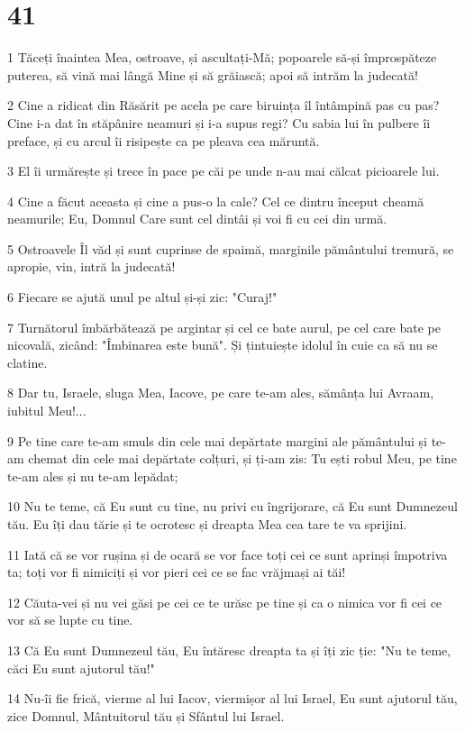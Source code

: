 \chapter{41}

\par 1 Tăceți înaintea Mea, ostroave, și ascultați-Mă; popoarele să-și împrospăteze puterea, să vină mai lângă Mine și să grăiască; apoi să intrăm la judecată!
\par 2 Cine a ridicat din Răsărit pe acela pe care biruința îl întâmpină pas cu pas? Cine i-a dat în stăpânire neamuri și i-a supus regi? Cu sabia lui în pulbere îi preface, și cu arcul îi risipește ca pe pleava cea măruntă.
\par 3 El îi urmărește și trece în pace pe căi pe unde n-au mai călcat picioarele lui.
\par 4 Cine a făcut aceasta și cine a pus-o la cale? Cel ce dintru început cheamă neamurile; Eu, Domnul Care sunt cel dintâi și voi fi cu cei din urmă.
\par 5 Ostroavele Îl văd și sunt cuprinse de spaimă, marginile pământului tremură, se apropie, vin, intră la judecată!
\par 6 Fiecare se ajută unul pe altul și-și zic: "Curaj!"
\par 7 Turnătorul îmbărbătează pe argintar și cel ce bate aurul, pe cel care bate pe nicovală, zicând: "Îmbinarea este bună". Și țintuiește idolul în cuie ca să nu se clatine.
\par 8 Dar tu, Israele, sluga Mea, Iacove, pe care te-am ales, sămânța lui Avraam, iubitul Meu!...
\par 9 Pe tine care te-am smuls din cele mai depărtate margini ale pământului și te-am chemat din cele mai depărtate colțuri, și ți-am zis: Tu ești robul Meu, pe tine te-am ales și nu te-am lepădat;
\par 10 Nu te teme, că Eu sunt cu tine, nu privi cu îngrijorare, că Eu sunt Dumnezeul tău. Eu îți dau tărie și te ocrotesc și dreapta Mea cea tare te va sprijini.
\par 11 Iată că se vor rușina și de ocară se vor face toți cei ce sunt aprinși împotriva ta; toți vor fi nimiciți și vor pieri cei ce se fac vrăjmași ai tăi!
\par 12 Căuta-vei și nu vei găsi pe cei ce te urăsc pe tine și ca o nimica vor fi cei ce vor să se lupte cu tine.
\par 13 Că Eu sunt Dumnezeul tău, Eu întăresc dreapta ta și îți zic ție: "Nu te teme, căci Eu sunt ajutorul tău!"
\par 14 Nu-îi fie frică, vierme al lui Iacov, viermișor al lui Israel, Eu sunt ajutorul tău, zice Domnul, Mântuitorul tău și Sfântul lui Israel.
